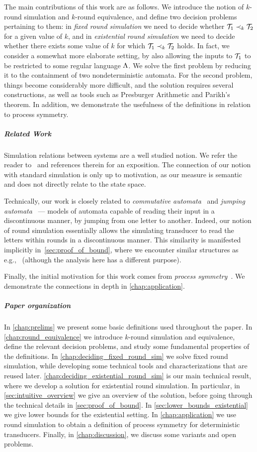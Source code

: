 The main contributions of this work are as follows. We introduce the notion of $k$-round simulation and $k$-round equivalence, and define two decision problems pertaining to them: in \emph{fixed round simulation} we need to decide whether $\mathcal{T}_1\prec_k \mathcal{T}_2$ for a given value of $k$, and in \emph{existential round simulation} we need to decide whether there exists some value of $k$ for which $\mathcal{T}_1\prec_k \mathcal{T}_2$ holds. In fact, we consider a somewhat more elaborate setting, by also allowing the inputs to $\mathcal{T}_1$ to be restricted to some regular language $\Lambda$.
We solve the first problem by reducing it to the containment of two nondeterministic automata. For the second problem, things become considerably more difficult, and the solution requires several constructions, as well as tools such as Presburger Arithmetic and Parikh's theorem. 
In addition, we demonstrate the usefulness of the definitions in relation to process symmetry.

\subparagraph*{Related Work} Simulation relations between systems are a well studied notion. We refer the reader to~\cite[Chapter 13]{Clarke2018a} and references therein for an exposition. The connection of our notion with standard simulation is only up to motivation, as our measure is semantic and does not directly relate to the state space.

Technically, our work is closely related to \emph{commutative automata}~\cite{Brzozowski1973} and \emph{jumping automata}~\cite{Fernau2015,Meduna2012} --- models of automata capable of reading their input in a discontinuous manner, by jumping from one letter to another. Indeed, our notion of round simulation essentially allows the simulating transducer to read the letters within rounds in a discontinuous manner. This similarity is manifested implicitly in~\autoref{sec:proof_of_bound}, where we encounter similar structures as e.g.,~\cite{Hoffmann2020} (although the analysis here has a different purpose).

Finally, the initial motivation for this work comes from \emph{process symmetry}~\cite{Almagor2020b,Clarke1996,Emerson1996,Ip1996,Lin2016}. We demonstrate the connections in depth in \autoref{chap:application}.

\subparagraph*{Paper organization}
In \autoref{chap:prelims} we present some basic definitions used throughout the paper. In \autoref{chap:round_equivalence} we introduce $k$-round simulation and equivalence, define the relevant decision problems, and study some fundamental properties of the definitions. In \autoref{chap:deciding_fixed_round_sim} we solve fixed round simulation, while developing some technical tools and characterizations that are reused later. \autoref{chap:deciding_existential_round_sim} is our main technical result, where we develop a solution for existential round simulation. In particular, in \autoref{sec:intuitive_overview} we give an overview of the solution, before going through the technical details in \autoref{sec:proof_of_bound}. In \autoref{sec:lower_bounds_existential} we give lower bounds for the existential setting.
In \autoref{chap:application} we use round simulation to obtain a definition of process symmetry for deterministic transducers. Finally, in \autoref{chap:discussion}, we discuss some variants and open problems.

